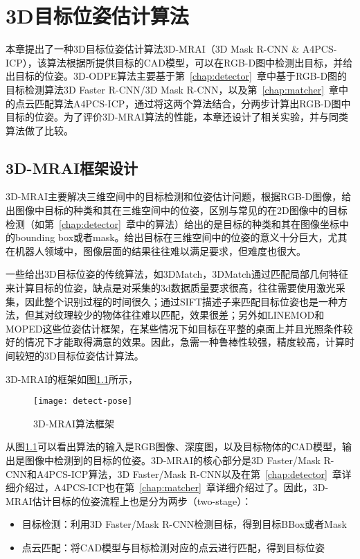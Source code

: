 \chapter{3D目标位姿估计算法}
\label{chap:pose}
本章提出了一种3D目标位姿估计算法3D-MRAI（3D Mask R-CNN \& A4PCS-ICP），该算法根据所提供目标的CAD模型，可以在RGB-D图中检测出目标，并给出目标的位姿。3D-ODPE算法主要基于第~\ref{chap:detector}~章中基于RGB-D图的目标检测算法3D Faster R-CNN/3D Mask R-CNN，以及第~\ref{chap:matcher}~章中的点云匹配算法A4PCS-ICP，通过将这两个算法结合，分两步计算出RGB-D图中目标的位姿。为了评价3D-MRAI算法的性能，本章还设计了相关实验，并与同类算法做了比较。

\section{3D-MRAI框架设计}
3D-MRAI主要解决三维空间中的目标检测和位姿估计问题，根据RGB-D图像，给出图像中目标的种类和其在三维空间中的位姿，区别与常见的在2D图像中的目标检测（如第~\ref{chap:detector}~章中的算法）给出的是目标的种类和其在图像坐标中的bounding box或者mask。给出目标在三维空间中的位姿的意义十分巨大，尤其在机器人领域中，图像层面的结果往往难以满足要求，但难度也很大。

一些给出3D目标位姿的传统算法，如3DMatch\cite{zeng20163dmatch}，3DMatch通过匹配局部几何特征来计算目标的位姿，缺点是对采集的3d数据质量要求很高，往往需要使用激光采集，因此整个识别过程的时间很久；通过SIFT描述子来匹配目标位姿\cite{dias2015sift}也是一种方法，但其对纹理较少的物体往往难以匹配，效果很差；另外如LINEMOD\cite{hinterstoisser2012gradient}和MOPED\cite{collet2011moped}这些位姿估计框架，在某些情况下如目标在平整的桌面上并且光照条件较好的情况下才能取得满意的效果。因此，急需一种鲁棒性较强，精度较高，计算时间较短的3D目标位姿估计算法。

3D-MRAI的框架如图\ref{fig:detect-pose}所示，
\begin{figure}[ht]
  \centering
  \texttt{[image: detect-pose]}
  \caption{3D-MRAI算法框架}
  \label{fig:detect-pose}
\end{figure}
从图\ref{fig:detect-pose}可以看出算法的输入是RGB图像、深度图，以及目标物体的CAD模型，输出是图像中检测到的目标的位姿。3D-MRAI的核心部分是3D Faster/Mask R-CNN和A4PCS-ICP算法，3D Faster/Mask R-CNN以及在第~\ref{chap:detector}~章详细介绍过，A4PCS-ICP也在第~\ref{chap:matcher}~章详细介绍过了。因此，3D-MRAI估计目标的位姿流程上也是分为两步（two-stage）：
\begin{itemize}
\item {\kai 目标检测}：利用3D Faster/Mask R-CNN检测目标，得到目标BBox或者Mask
\item {\kai 点云匹配}：将CAD模型与目标检测对应的点云进行匹配，得到目标位姿
\end{itemize}

